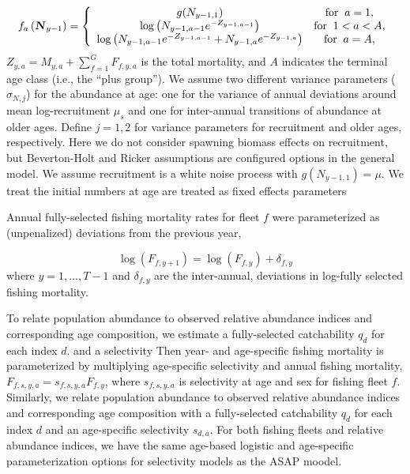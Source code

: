 \documentclass[12pt,letterpaper, leqno]{article}
\begin{document}
\vspace{-12pt}
\begin{equation*}
 f_a\left(\textbf{\textsl{N}}_{y-1}\right) = \left\{ 
 \begin{array}{cc}
   g(N_{y-1,1}) & \text{for}\;\;a = 1,\\
   \log\left(N_{y-1,a-1}e^{-Z_{y-1,a-1}}\right) & \text{for}\;\;1<a<A,\\
   \log\left(N_{y-1,a-1}e^{-Z_{y-1,a-1}} + N_{y-1,a}e^{-Z_{y-1,a}}\right) & \text{for}\;\;a = A,
 \end{array}\right.
\end{equation*}
$Z_{y,a} = M_{y,a}+ \sum^G_{f=1} F_{f,y,a}$ is the total mortality, and $A$ indicates the terminal age class (i.e., the ``plus group''). We assume two different variance parameters ($\sigma_{N,j}$) for the abundance at age: one for the variance of annual deviations around mean log-recruitment $\mu_s$ and one for inter-annual transitions of abundance at older ages. Define $j = 1,2$ for variance parameters for recruitment and older ages, respectively. Here we do not consider spawning biomass effects on recruitment, but Beverton-Holt and Ricker assumptions are configured options in the general model. We assume recruitment is a white noise process with $g(N_{y-1,1}) = \mu$. We treat the initial numbers at age are treated as fixed effects parameters

Annual fully-selected fishing mortality rates for fleet $f$ were parameterized as (unpenalized) deviations from the previous year,

\vspace{-12pt}
\begin{equation*}
 \log\left(F_{f,y+1}\right) = \log\left(F_{f,y}\right) + \delta_{f,y}
\end{equation*}
where $y=1,\ldots,T-1$ and $\delta_{f,y}$ are the inter-annual, deviations in log-fully selected fishing mortality. 

To relate population abundance to observed relative abundance indices and corresponding age composition, we estimate a fully-selected catchability $q_{d}$ for each index $d$. and a selectivity
Then year- and age-specific fishing mortality is parameterized by multiplying age-specific selectivity and annual fishing mortality, $ F_{f,s,y,a} = s_{f,s,y,a} F_{f,y}$, where $s_{f,s,y,a}$ is selectivity at age and sex for fishing fleet $f$. Similarly, we relate population abundance to observed relative abundance indices and corresponding age composition with a fully-selected catchability $q_{d}$ for each index $d$ and an age-specific selectivity $s_{d,a}$. For both fishing fleets and relative abundance indices, we have the same age-based logistic and age-specific parameterization options for selectivity models as the ASAP moodel.
\end{document}
